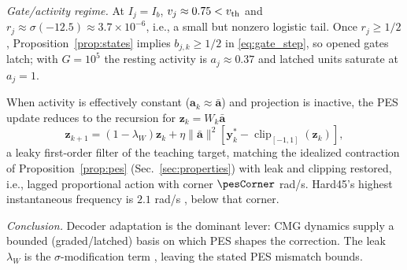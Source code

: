 \documentclass[letterpaper, 10 pt, conference]{ieeeconf}
\newcommand{\clip}{\operatorname{clip}}
\begin{document}
\emph{Gate/activity regime.} At $I_j=I_b$, $v_j\approx0.75<v_{\rm th}$ and $r_j\approx\sigma(-12.5)\approx3.7\times10^{-6}$, i.e., a small but nonzero logistic tail. Once $r_j\ge1/2$, Proposition~\ref{prop:states} implies $b_{j,k}\ge1/2$ in \eqref{eq:gate_step}, so opened gates latch; with $G=10^5$ the resting activity is $a_j\approx0.37$ and latched units saturate at $a_j=1$.

When activity is effectively constant ($\bm a_k\approx\bar{\bm a}$) and projection is inactive, the PES update reduces to the recursion for $\bm z_k=W_k\bar{\bm a}$
\begin{equation}
 \bm z_{k+1}=(1-\lambda_W)\bm z_k
 +\eta\|\bar{\bm a}\|^2[\bm y_k^*-\clip_{[-1,1]}(\bm z_k)],
 \label{eq:constantbasis}
\end{equation}
a leaky first-order filter of the teaching target, matching the idealized
contraction of Proposition~\ref{prop:pes} (Sec.~\ref{sec:properties}) with
leak and clipping restored, i.e., lagged proportional action with corner
$\pesCorner$ rad/s. Hard45’s highest instantaneous frequency is $2.1$ rad/s
\cite{sandoval2018instantaneous}, below that corner.

\emph{Conclusion.} Decoder adaptation is the dominant lever: CMG dynamics supply a bounded (graded/latched) basis on which PES shapes the correction. The leak $\lambda_W$ is the $\sigma$-modification term \cite{ioannou1996robust}, leaving the stated PES mismatch bounds.


\end{document}
